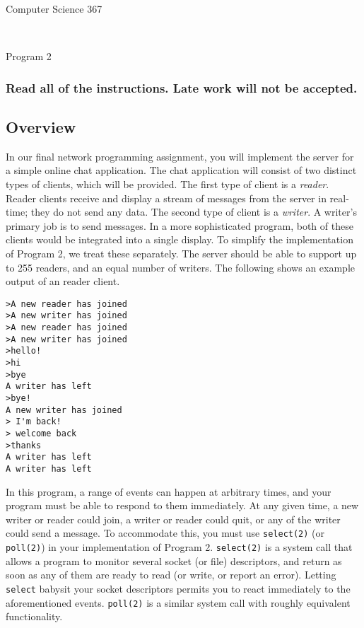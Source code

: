 \documentclass[12pt]{article}
\begin{document}
\begin{center}
	\begin{LARGE}
		Computer Science 367
	\end{LARGE}\\
	\vspace{15pt}
	\begin{large}
		Program 2\\
	\end{large}
\end{center}

\subsubsection*{Read all of the instructions.  Late work will not be accepted.}


\subsection*{Overview}
In our final network programming assignment, you will implement the server for a simple online chat application. The chat application will consist of two distinct types of clients, which will be provided. The first type of client is a {\it reader}.  Reader clients receive and display a stream of messages from the server in real-time; they do not send any data.  The second type of client is a {\it writer}. A writer's primary job is to send messages.  In a more sophisticated program, both of these clients would be integrated into a single display.  To simplify the implementation of Program 2, we treat these separately.  The server should be able to support up to 255 readers, and an equal number of writers.  The following shows an example output of an reader client.

\begin{verbatim}
>A new reader has joined
>A new writer has joined
>A new reader has joined
>A new writer has joined
>hello!
>hi
>bye
A writer has left
>bye!
A new writer has joined
> I'm back!
> welcome back
>thanks 
A writer has left
A writer has left
\end{verbatim}

In this program, a range of events can happen at arbitrary times, and your program must be able to respond to them immediately.  At any given time, a new writer or reader could join, a writer or reader could quit, or any of the writer could send a message.  To accommodate this, you must use \verb|select(2)| (or \verb|poll(2)|) in your implementation of Program 2.  \verb|select(2)| is a system call that allows a program to monitor several socket (or file) descriptors, and return as soon as any of them are ready to read (or write, or report an error).  Letting \verb|select| babysit your socket descriptors permits you to react immediately to the aforementioned events.  \verb|poll(2)| is a similar system call with roughly equivalent functionality.
\end{document}
